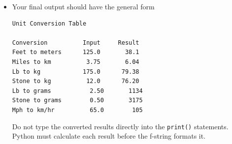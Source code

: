 \documentclass{article}
\begin{document}
\begin{enumerate}
\begin{itemize}
\begin{verbatim}
print(f"Feet to meters    "
      f"{feet:8.1f}"
      f"{meters:10.1f}")
\end{verbatim}

\item Your final output should have the general form

\begin{verbatim}
Unit Conversion Table

Conversion          Input     Result
Feet to meters      125.0       38.1
Miles to km          3.75       6.04
Lb to kg            175.0      79.38
Stone to kg          12.0      76.20
Lb to grams           2.50       1134
Stone to grams        0.50       3175
Mph to km/hr          65.0        105
\end{verbatim}

Do not type the converted results directly into the
\texttt{print()} statements.  Python must calculate each result
before the f-string formats it.

\end{itemize}
\end{enumerate}
\end{document}
